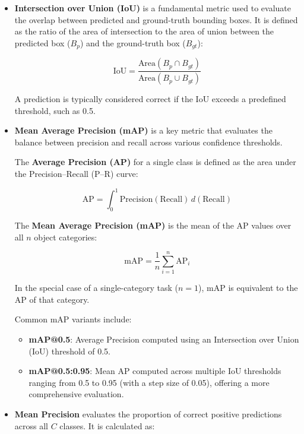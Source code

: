 \begin{itemize}
    \item \textbf{Intersection over Union (IoU)} is a fundamental metric used to evaluate the overlap between predicted and ground-truth bounding boxes. It is defined as the ratio of the area of intersection to the area of union between the predicted box ($B_p$) and the ground-truth box ($B_{gt}$):

    \begin{equation}
        \text{IoU} = \frac{\text{Area}(B_p \cap B_{gt})}{\text{Area}(B_p \cup B_{gt})}
    \end{equation}

    A prediction is typically considered correct if the IoU exceeds a predefined threshold, such as 0.5.

    
    \item \textbf{Mean Average Precision (mAP)} is a key metric that evaluates the balance between precision and recall across various confidence thresholds.

    The \textbf{Average Precision (AP)} for a single class is defined as the area under the Precision–Recall (P–R) curve:

    \begin{equation}
        \text{AP} = \int_{0}^{1} \text{Precision}(\text{Recall}) \, d(\text{Recall})
    \end{equation}

    The \textbf{Mean Average Precision (mAP)} is the mean of the AP values over all $n$ object categories:

    \begin{equation}
        \text{mAP} = \frac{1}{n} \sum_{i=1}^{n} \text{AP}_i
    \end{equation}

    In the special case of a single-category task ($n = 1$), mAP is equivalent to the AP of that category.

    Common mAP variants include:
    \begin{itemize}
        \item \textbf{mAP@0.5}: Average Precision computed using an Intersection over Union (IoU) threshold of 0.5.
        \item \textbf{mAP@0.5:0.95}: Mean AP computed across multiple IoU thresholds ranging from 0.5 to 0.95 (with a step size of 0.05), offering a more comprehensive evaluation.
    \end{itemize}

    \item \textbf{Mean Precision} evaluates the proportion of correct positive predictions across all $C$ classes. It is calculated as:


\end{itemize}
